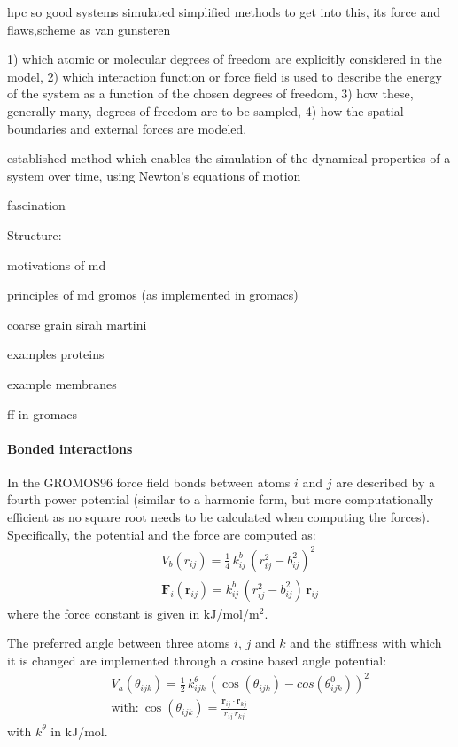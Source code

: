 \vspace{5cm}


hpc so good systems simulated
simplified methods
to get into this, its force and flaws,scheme as van gunsteren

1) which atomic or molecular degrees of freedom are explicitly considered in the model,
2) which interaction function or force field is used to describe the energy of the system as a function of the chosen degrees of freedom,
3) how these, generally many, degrees of freedom are to be sampled,
4) how the spatial boundaries and external forces are modeled. 

established method which enables the simulation of the dynamical
properties of a system over time, using Newton’s equations of motion

fascination

Structure:

motivations of md

principles of md 
	gromos (as implemented in gromacs)
	
coarse grain
	sirah
	martini

examples proteins

example membranes




ff in gromacs


\paragraph{Bonded interactions}

In the GROMOS96 force field bonds between atoms $i$ and $j$ are described by a fourth power potential (similar to a harmonic form, but more computationally efficient as no square root needs to be calculated when computing the forces). Specifically, the potential and the force are computed as:
\begin{eqnarray}
&& V_b(r_{ij}) = \frac{1}{4}\,k^b_{ij}\,\left(r_{ij}^2 - b_{ij}^2\right)^2 \\
&& \textbf{F}_i(\textbf{r}_{ij}) = k^b_{ij}\,\left(r_{ij}^2 - b_{ij}^2\right)\,\textbf{r}_{ij}
\end{eqnarray}
where the force constant is given in kJ/mol/m$^2$.

The preferred angle between three atoms $i$, $j$ and $k$ and the stiffness with which it is changed are implemented through a cosine based angle potential:
\begin{eqnarray}
&& V_a(\theta_{ijk}) = \frac{1}{2}\,k^\theta_{ijk}\,\left(\cos\left(\theta_{ijk}\right) - cos\left(\theta^0_{ijk}\right)\right)^2 \\
&& \text{with:} \ \cos\left(\theta_{ijk}\right) = \frac{\textbf{r}_{ij}\cdot \textbf{r}_{kj}}{r_{ij}\,r_{kj}}
\end{eqnarray}
with $k^\theta$ in kJ/mol.

